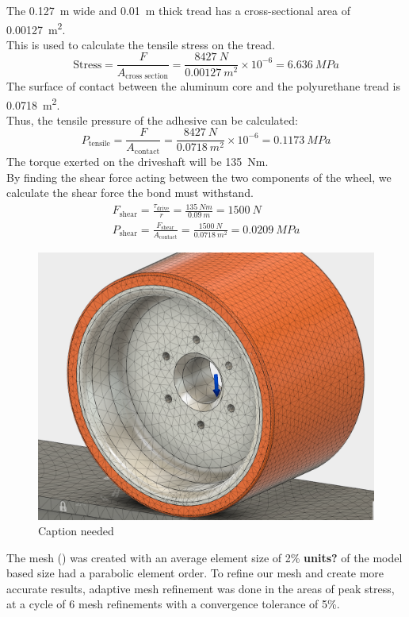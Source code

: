 \documentclass[main.tex]{subfiles}
\begin{document}
    The \SI{0.127}{m} wide and \SI{0.01}{m} thick tread has a cross-sectional area of \SI{0.00127}{m^2}.\\
    This is used to calculate the tensile stress on the tread.
    	\[
  		\textrm{Stress}=\frac{F}{A_{\textrm{cross section}}}=\frac{\SI{8427}{N}}{\SI{0.00127}{m^2}} \times 10^{-6}=\SI{6.636}{MPa}
   		\]
    The surface of contact between the aluminum core and the polyurethane tread is \SI{0.0718}{m^2}.\\
    Thus, the tensile pressure of the adhesive can be calculated:
    	\[
        P_{\textrm{tensile}}=\frac{F}{A_{\textrm{contact}}}=\frac{\SI{8427}{N}}{\SI{0.0718}{m^2}} \times 10^{-6}=\SI{0.1173}{MPa}
        \]
    The torque exerted on the driveshaft will be \SI{135}{Nm}.\\
    By finding the shear force acting between the two components of the wheel, we calculate the shear force the bond must withstand.
    	\begin{gather*}
        F_{\textrm{shear}}=\frac{\tau_{\textrm{drive}}}{r}=\frac{\SI{135}{Nm}}{\SI{0.09}{m}}=\SI{1500}{N}\\
        P_{\textrm{shear}}=\frac{F_{\textrm{shear}}}{A_{\textrm{contact}}}=\frac{\SI{1500}{N}}{\SI{0.0718}{m^2}}=\SI{0.0209}{MPa}
        \end{gather*}
    \begin{figure}
        \centering
        \includegraphics[width=\linewidth]{images/fig22}
        \caption{Caption needed}
        \label{fig:mesh}
    \end{figure}
    The mesh () was created with an average element size of 2\% \textbf{units?} of the model based size had a parabolic element order. To refine our mesh and create more accurate results, adaptive mesh refinement was done in the areas of peak stress, at a cycle of 6 mesh refinements with a convergence tolerance of 5\%.
\end{document}
